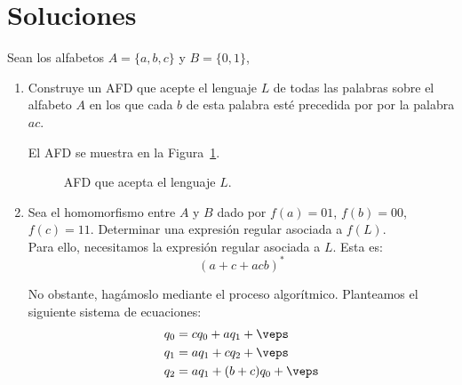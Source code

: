 \documentclass[12pt]{article}
\begin{document}
\section*{Soluciones}
\begin{ejercicio}[2.5 puntos]
    Sean los alfabetos $A = \{a, b, c\}$ y $B = \{0, 1\}$,
    \begin{enumerate}
        \item Construye un AFD que acepte el lenguaje $L$ de todas las palabras sobre el alfabeto $A$ en los que cada $b$ de esta palabra esté precedida por por la palabra $ac$.
        
        El AFD se muestra en la Figura~\ref{fig:afd}.
        \begin{figure}
            \centering
            \caption{AFD que acepta el lenguaje $L$.}
            \label{fig:afd}
        \end{figure}
        \item Sea el homomorfismo entre $A$ y $B$ dado por $f(a) = 01$, $f(b) = 00$, $f(c) = 11$. Determinar una expresión regular asociada a $f(L)$.\\
        
        Para ello, necesitamos la expresión regular asociada a $L$. Esta es:
        \begin{equation*}
            (a+c+acb)^*
        \end{equation*}

        No obstante, hagámoslo mediante el proceso algorítmico. Planteamos el siguiente sistema de ecuaciones:
        \begin{align*}
            q_0 &= cq_0+aq_1+\veps\\
            q_1 &= aq_1+cq_2+\veps\\
            q_2 &= aq_1+(b+c)q_0+\veps
        \end{align*}


\end{enumerate}
\end{ejercicio}
\end{document}
